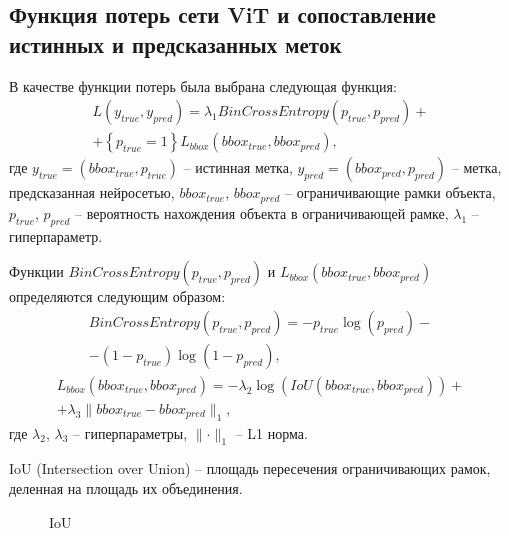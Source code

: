 \documentclass[14pt,a4paper]{extarticle}
\begin{document}
\newpage
\subsection{Функция потерь сети ViT и сопоставление истинных и предсказанных меток}

В качестве функции потерь была выбрана следующая функция:
\begin{multline}
L \left(y_{true}, y_{pred}\right) = \lambda_1 BinCrossEntropy\left(p_{true}, p_{pred}\right) +\\
+\left\{p_{true}=1\right\} L_{bbox} \left(bbox_{true}, bbox_{pred}\right),
\end{multline}
где $y_{true} = (bbox_{true}, p_{true})$ -- истинная метка, $y_{pred} = (bbox_{pred}, p_{pred})$ -- метка, предсказанная нейросетью, $bbox_{true}$, $bbox_{pred}$ -- ограничивающие рамки объекта, $p_{true}$, $p_{pred}$ -- вероятность нахождения объекта в ограничивающей рамке, $\lambda_1$ -- гиперпараметр. 

Функции $BinCrossEntropy\left(p_{true}, p_{pred}\right)$ и $L_{bbox} \left(bbox_{true}, bbox_{pred}\right)$ определяются следующим образом:
\begin{multline}
BinCrossEntropy\left(p_{true}, p_{pred}\right) = - p_{true} \log(p_{pred}) -\\ - ( 1 - p_{true} ) \log(1 - p_{pred}),
\end{multline}
\begin{multline}
L_{bbox} \left(bbox_{true}, bbox_{pred}\right) = - \lambda_2 \log(IoU\left(bbox_{true}, bbox_{pred}\right)) +\\ + \lambda_3 \parallel bbox_{true} - bbox_{pred}\parallel_1,
\end{multline}
где $\lambda_2$, $\lambda_3$ -- гиперпараметры, $\parallel \cdot \parallel_1$ -- L1 норма.

IoU (Intersection over Union) -- площадь пересечения ограничивающих рамок, деленная на площадь их объединения.
\begin{figure}[h]
\caption{IoU}
\label{IoU}
\end{figure}  
\end{document}
